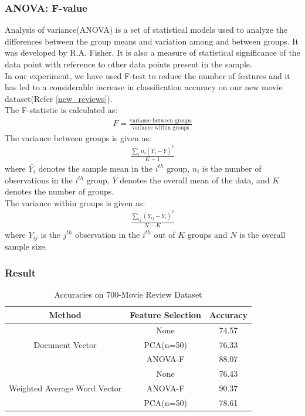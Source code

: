 \documentclass[11pt,a4paper]{article}
\begin{document}
\subsubsection{ANOVA: F-value}
Analysis of variance(ANOVA) is a set of statistical models used to analyze the differences between the group means and variation among and between groups. It was developed by R.A. Fisher. It is also a measure of statistical significance of the data point with reference to other data points present in the sample.\\
In our experiment, we have used F-test to reduce the number of features and it has led to a considerable increase in classification accuracy on our new movie dataset(Refer \ref{new_reviews}).\\
The F-statistic is calculated as:
\begin{align*}
F=\frac{\text{variance between groups}}{\text{variance within groups}}
\end{align*}
The variance between groups is given as:
\begin{align}
\frac{\sum_{i}n_i(\bar{Y_i}-\bar{Y})^2}{K-1}
\end{align}
where $\bar{Y_i}$ denotes the sample mean in the $i^{th}$ group, $n_i$ is the number of observations in the $i^{th}$ group, $\bar{Y}$ denotes the overall mean of the data, and $K$ denotes the number of groups.\\
The variance within groups is given as:
\begin{align}
\frac{\sum_{ij}(Y_{ij}-\bar{Y_i})^2}{N-K}
\end{align}
where $Y_{ij}$ is the $j^{th}$ observation in the $i^{th}$ out of $K$ groups and $N$ is the overall sample size.

\subsubsection{Result}
\begin{table}[h!]
\centering
\small
\begin{tabular}{|c|c|c|}
\hline
\textbf{Method} & \textbf{Feature Selection} & \textbf{Accuracy} \\ \hline
\multirow{3}{*}{Document Vector}              & None      & 74.57 \\ \cline{2-3} 
                                              & PCA(n=50) & 76.33 \\ \cline{2-3} 
                                              & ANOVA-F & 88.07 \\ \hline
\multirow{3}{*}{Weighted Average Word Vector} & None      & 76.43 \\ \cline{2-3} 
                                              & ANOVA-F   & 90.37 \\ \cline{2-3} 
                                              & PCA(n=50) & 78.61 \\ \hline
\end{tabular}
\caption {Accuracies on 700-Movie Review Dataset}
\label{table:700_movie_features}
\end{table}
\end{document}
